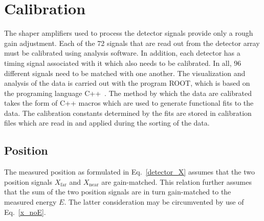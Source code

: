 \chapter{Calibration}
\label{calib}
The shaper amplifiers used to process the detector signals provide only a rough gain adjustment.  Each of the 72 signals that are read out from the detector array must be calibrated using analysis software.  In addition, each detector has a timing signal associated with it which also needs to be calibrated.  
In all, 96 different signals need to be matched with one another.  The visualization and analysis of the data is carried out with the program ROOT, which is based on the programing language C++~\cite{Brun_1998}.  The method by which the data are calibrated takes the form of C++ macros which are used to generate functional fits to the data.  The calibration constants determined by the fits are stored in calibration files which are read in and applied during the sorting of the data.
\section{Position}
The measured position as formulated in Eq.~\ref{detector_X} assumes that the two position signals $X_\mathrm{far}$ and $X_\mathrm{near}$ are gain-matched.  This relation further assumes that the sum of the two position signals are in turn gain-matched to the measured energy $E$.  The latter consideration may be circumvented by use of Eq.~\ref{x_noE}. %

